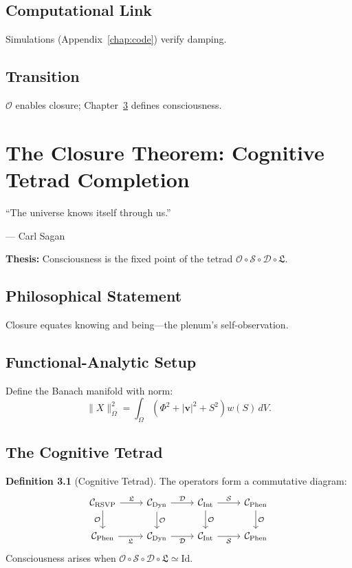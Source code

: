 \documentclass[12pt]{book}
\theoremstyle{definition}
\newtheorem{definition}{Definition}[chapter]
\begin{document}
\section{Computational Link}
Simulations (Appendix~\ref{chap:code}) verify damping.

\section{Transition}
\(\mathcal{O}\) enables closure; Chapter~\ref{chap:closure} defines consciousness.

\chapter{The Closure Theorem: Cognitive Tetrad Completion}
\label{chap:closure}
\epigraph{``The universe knows itself through us.''}{--- Carl Sagan}

\textbf{Thesis:} Consciousness is the fixed point of the tetrad \(\mathcal{O} \circ \mathcal{S} \circ \mathcal{D} \circ \mathfrak{L}\).

\section{Philosophical Statement}
Closure equates knowing and being—the plenum’s self-observation.

\section{Functional-Analytic Setup}
Define the Banach manifold with norm:
\begin{equation}
\label{eq:norm}
\|X\|_\Omega^2 = \int_\Omega (\Phi^2 + |\mathbf{v}|^2 + S^2) w(S) \, dV.
\end{equation}

\section{The Cognitive Tetrad}
\begin{definition}[Cognitive Tetrad]
\label{def:cognitive_tetrad}
The operators form a commutative diagram:
\begin{equation}
\begin{tikzcd}
\mathcal{C}_{\text{RSVP}} \arrow[r, "\mathfrak{L}"] \arrow[d, "\mathcal{O}"'] & 
\mathcal{C}_{\text{Dyn}} \arrow[r, "\mathcal{D}"] \arrow[d, "\mathcal{O}"] &
\mathcal{C}_{\text{Int}} \arrow[r, "\mathcal{S}"] \arrow[d, "\mathcal{O}"] &
\mathcal{C}_{\text{Phen}} \arrow[d, "\mathcal{O}"] \\
\mathcal{C}_{\text{Phen}} \arrow[r, "\mathfrak{L}"'] &
\mathcal{C}_{\text{Dyn}} \arrow[r, "\mathcal{D}"'] &
\mathcal{C}_{\text{Int}} \arrow[r, "\mathcal{S}"'] &
\mathcal{C}_{\text{Phen}}
\end{tikzcd}
\end{equation}
Consciousness arises when \(\mathcal{O} \circ \mathcal{S} \circ \mathcal{D} \circ \mathfrak{L} \simeq \text{Id}\).
\end{definition}
\end{document}
